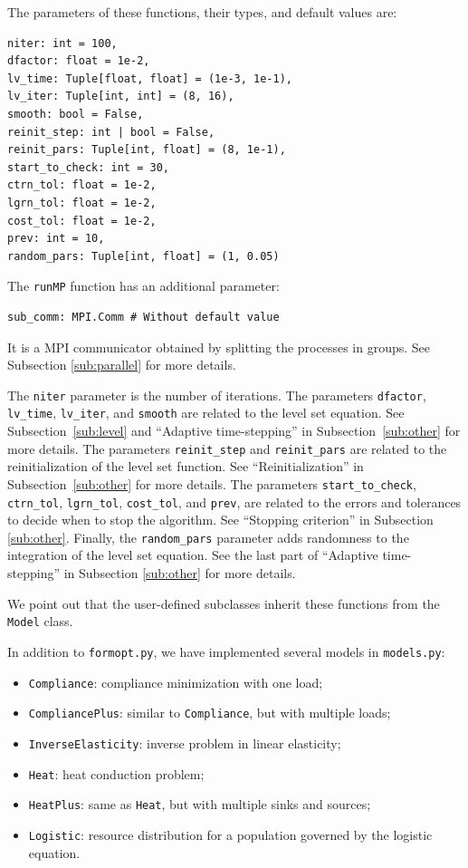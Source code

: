 \documentclass[iicol,pdflatex,sn-mathphys-ay]{sn-jnl}%
\theoremstyle{thmstyleone}%
\theoremstyle{thmstyletwo}%
\theoremstyle{thmstylethree}%
\begin{document}
The parameters of these functions, their types, and default values are:
\begin{lstlisting}
niter: int = 100,
dfactor: float = 1e-2,
lv_time: Tuple[float, float] = (1e-3, 1e-1),
lv_iter: Tuple[int, int] = (8, 16),
smooth: bool = False,
reinit_step: int | bool = False,
reinit_pars: Tuple[int, float] = (8, 1e-1),
start_to_check: int = 30,
ctrn_tol: float = 1e-2,
lgrn_tol: float = 1e-2,
cost_tol: float = 1e-2,
prev: int = 10,
random_pars: Tuple[int, float] = (1, 0.05)
\end{lstlisting}
The \texttt{runMP} function has an additional parameter:
\begin{lstlisting}
sub_comm: MPI.Comm # Without default value
\end{lstlisting}
It is a MPI communicator obtained by splitting the processes in groups.
See Subsection \ref{sub:parallel} for more details.

The \texttt{niter} parameter is the number of iterations.
The parameters \texttt{dfactor}, \texttt{lv\_time}, \texttt{lv\_iter},
and \texttt{smooth} are related to the level set equation.
See Subsection~\ref{sub:level} and ``Adaptive time-stepping''
in Subsection~\ref{sub:other} for more details.
The parameters \texttt{reinit\_step} and \texttt{reinit\_pars}
are related to the reinitialization of the level set function.
See ``Reinitialization'' in Subsection~\ref{sub:other} for more details.
The parameters \texttt{start\_to\_check}, \texttt{ctrn\_tol},
\texttt{lgrn\_tol}, \texttt{cost\_tol}, and \texttt{prev}, are related
to the errors and tolerances to decide when to stop the algorithm.
See ``Stopping criterion'' in Subsection \ref{sub:other}.
Finally, the \texttt{random\_pars} parameter adds randomness
to the integration of the level set equation.
See the last part of ``Adaptive time-stepping''
in Subsection \ref{sub:other} for more details.

We point out that the user-defined subclasses inherit
these functions from the \texttt{Model} class.

In addition to \texttt{formopt.py},
we have implemented several models in \texttt{models.py}:
\begin{itemize}
\item \texttt{Compliance}: compliance minimization with one load;
\item \texttt{CompliancePlus}: similar to \texttt{Compliance},
		but with multiple loads;
\item \texttt{InverseElasticity}: inverse problem in linear elasticity;
\item \texttt{Heat}: heat conduction problem;
\item \texttt{HeatPlus}: same as \texttt{Heat},
		but with multiple sinks and sources;
\item \texttt{Logistic}: resource distribution for a population
		governed by the logistic equation.
\end{itemize}
\end{document}
